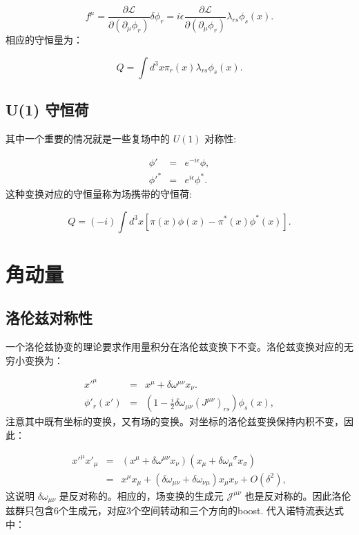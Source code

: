 \documentclass[10pt,UTF8]{ctexart}
\begin{document}
\begin{equation}
f^{\mu}=\frac{\partial\mathcal{L}}{\partial\left(\partial_{\mu}\phi_{r}\right)}\delta\phi_{r}=i\epsilon\frac{\partial\mathcal{L}}{\partial\left(\partial_{\mu}\phi_{r}\right)}\lambda_{rs}\phi_{s}\left(x\right).
\end{equation}
相应的守恒量为： 

\begin{equation}
Q=\int d^{3}x\pi_{r}\left(x\right)\lambda_{rs}\phi_{s}\left(x\right).
\end{equation}


\subsection*{U(1) 守恒荷}
\noindent
其中一个重要的情况就是一些复场中的 $U\left(1\right)$ 对称性:

\begin{eqnarray}
\phi' & = & e^{-i\epsilon}\phi,\\
\phi'^{*} & = & e^{i\epsilon}\phi^{*}.
\end{eqnarray}
这种变换对应的守恒量称为场携带的守恒荷: 

\begin{equation}
Q=\left(-i\right)\int d^{3}x\left[\pi\left(x\right)\phi\left(x\right)-\pi^{*}\left(x\right)\phi^{*}\left(x\right)\right].
\end{equation}


\section*{角动量}

\subsection*{洛伦兹对称性}
\noindent
一个洛伦兹协变的理论要求作用量积分在洛伦兹变换下不变。洛伦兹变换对应的无穷小变换为：

\begin{eqnarray}
x'^{\mu} & = & x^{\mu}+\delta\omega^{\mu\nu}x_{\nu}.\\
\phi'_{r}\left(x'\right) & = & \left(1-\frac{i}{2}\delta\omega_{\mu\nu}\left(J^{\mu\nu}\right)_{rs}\right)\phi_{s}\left(x\right),
\end{eqnarray}
注意其中既有坐标的变换，又有场的变换。对坐标的洛伦兹变换保持内积不变，因此：

\begin{eqnarray}
x'^{\mu}x'_{\mu} & = & \left(x^{\mu}+\delta\omega^{\mu\nu}x_{\nu}\right)\left(x_{\mu}+\delta{\omega_{\mu}}^{\sigma}x_{\sigma}\right)\nonumber \\
 & = & x^{\mu}x_{\mu}+\left(\delta\omega_{\mu\nu}+\delta\omega_{\nu\mu}\right)x_{\mu}x_{\nu}+O\left(\delta^{2}\right),
\end{eqnarray}
这说明 $\delta\omega_{\mu\nu}$ 是反对称的。相应的，场变换的生成元 $\mathcal{J}^{\mu\nu}$
也是反对称的。因此洛伦兹群只包含6个生成元，对应3个空间转动和三个方向的boost. 代入诺特流表达式中：
\end{document}
